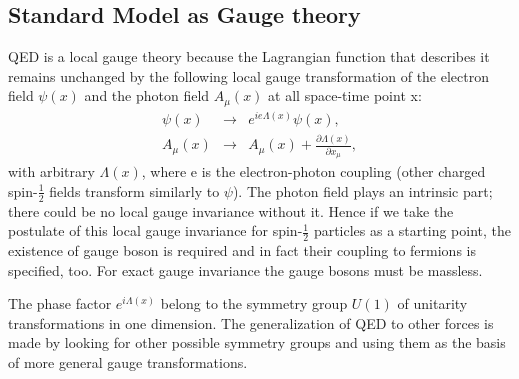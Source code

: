 \subsection{Standard Model as Gauge theory}
QED is a local gauge theory because the Lagrangian function that describes it remains unchanged by the following local gauge transformation of the electron field $\psi(x)$ and the photon field $A_\mu(x)$ at all space-time point x:
\begin{eqnarray}
    \psi(x) & \rightarrow & e^{ie\Lambda(x)}\psi(x), \nonumber \\
    A_\mu(x) & \rightarrow & A_\mu(x) + \frac{\partial \Lambda(x)}{\partial x_\mu}, \nonumber
\end{eqnarray}
with arbitrary $\Lambda(x)$, where e is the electron-photon coupling (other charged spin-$\frac{1}{2}$ fields transform similarly to $\psi$). The photon field plays an intrinsic part; there could be no local gauge invariance without it. Hence if we take the postulate of this local gauge invariance for spin-$\frac{1}{2}$ particles as a starting point, the existence of gauge boson is required and in fact their coupling to fermions is specified, too. For exact gauge invariance the gauge bosons must be massless.

The phase factor $e^{i\Lambda(x)}$ belong to the symmetry group $U(1)$ of unitarity transformations in one dimension. The generalization of QED to other forces is made by looking for other possible symmetry groups and using them as the basis of more general gauge transformations. 
        
